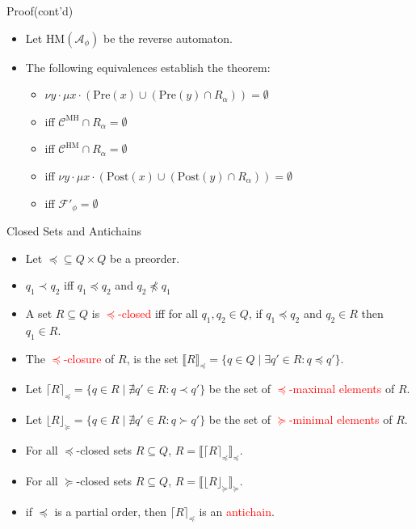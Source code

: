 \documentclass[12pt]{beamer}
\begin{document}
\begin{frame}{Proof(cont'd)}
	\begin{itemize}
		\item Let $\text{HM}(\mathcal{A}_{\phi})$ be the reverse automaton.
		\item The following equivalences establish the theorem:
		\begin{itemize}
				\item $\nu y \cdot \mu x \cdot (\text{Pre}(x) \cup (\text{Pre}(y) \cap R_{\alpha})) = \emptyset$
				\item iff $\mathcal{C}^{\text{MH}} \cap R_{\alpha} = \emptyset$
				\item iff $\mathcal{C}^{\text{HM}} \cap R_{\alpha} = \emptyset$
				\item iff $\nu y \cdot \mu x \cdot (\text{Post}(x) \cup (\text{Post}(y) \cap R_{\alpha})) = \emptyset$
				\item iff $\mathcal{F}'_{\phi} = \emptyset$
		\end{itemize}
	\end{itemize}
\end{frame}

\begin{frame}{Closed Sets and Antichains}
	\begin{itemize}
		\item Let $\preceq \subseteq Q \times Q$ be a preorder.
		\item $q_{1} \prec q_{2}$ iff $q_{1} \preceq q_{2}$ and $q_{2} \npreceq q_{1}$
		\item A set $R \subseteq Q$ is \textcolor{red}{$\preceq$-closed} iff for all $q_{1}, q_{2} \in Q$, if $q_{1} \preceq q_{2}$ and $q_{2} \in R$ then $q_{1} \in R$.
		\item The \textcolor{red}{$\preceq$-closure} of $R$, is the set $\llbracket R \rrbracket_{\preceq} = \{q \in Q \mid \exists q' \in R : q \preceq q'\}$.
		\item Let $\lceil R \rceil_{\preceq} = \{q \in R \mid \nexists q' \in R : q \prec q'\}$ be the set of \textcolor{red}{$\preceq$-maximal elements} of $R$.
		\item Let $\lfloor R \rfloor_{\succeq} = \{q \in R \mid \nexists q' \in R : q \succ q'\}$ be the set of \textcolor{red}{$\succeq$-minimal elements} of $R$.
		\item For all $\preceq$-closed sets $R \subseteq Q$, $R = \llbracket \lceil R \rceil_{\preceq} \rrbracket_{\preceq}$.
		\item For all $\succeq$-closed sets $R \subseteq Q$, $R = \llbracket \lfloor R \rfloor_{\succeq} \rrbracket_{\succeq}$.
		\item if $\preceq$ is a partial order, then $\lceil R \rceil_{\preceq}$ is an \textcolor{red}{antichain}.
	\end{itemize}
\end{frame}
\end{document}
